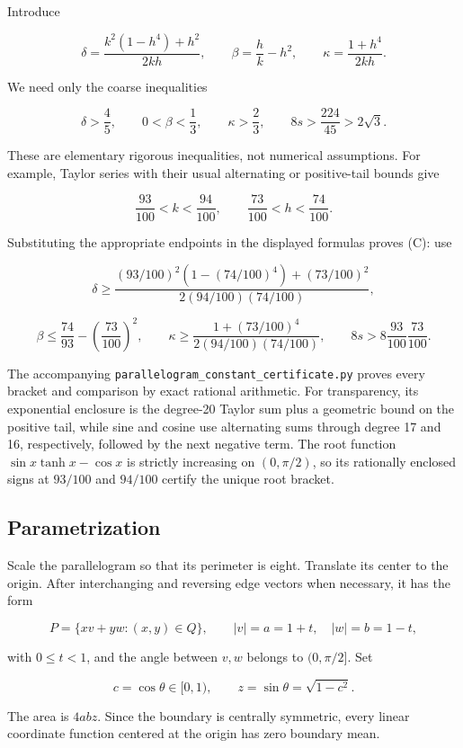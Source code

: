 \documentclass[11pt,a4paper]{article}
\begin{document}
Introduce

\[
\delta=\frac{k^2(1-h^4)+h^2}{2kh},\qquad
\beta=\frac hk-h^2,\qquad
\kappa=\frac{1+h^4}{2kh}.
\]

We need only the coarse inequalities

\[
\delta>\frac45,\qquad 0<\beta<\frac13,\qquad
\kappa>\frac23,\qquad
8s>\frac{224}{45}>2\sqrt3.
\tag{C}
\]

These are elementary rigorous inequalities, not numerical assumptions.
For example, Taylor series with their usual alternating or positive-tail
bounds give

\[
\frac{93}{100}<k<\frac{94}{100},\qquad
\frac{73}{100}<h<\frac{74}{100}.
\]

Substituting the appropriate endpoints in the displayed formulas proves
(C): use

\[
\delta\ge
\frac{(93/100)^2(1-(74/100)^4)+(73/100)^2}
{2(94/100)(74/100)},
\]

\[
\beta\le\frac{74}{93}-\left(\frac{73}{100}\right)^2,
\qquad
\kappa\ge\frac{1+(73/100)^4}{2(94/100)(74/100)},
\qquad
8s>8\frac{93}{100}\frac{73}{100}.
\]

The accompanying \texttt{parallelogram\_constant\_certificate.py} proves
every bracket and comparison by exact rational arithmetic. For
transparency, its exponential enclosure is the degree-20 Taylor sum plus
a geometric bound on the positive tail, while sine and cosine use
alternating sums through degree 17 and 16, respectively, followed by the
next negative term. The root function \(\sin x \tanh x-\cos x\) is
strictly increasing on \((0,\pi /2)\), so its rationally enclosed signs at
\(93/100\) and \(94/100\) certify the unique root bracket.

\hypertarget{022-parametrization}{%
\subsection{Parametrization}\label{022-parametrization}}

Scale the parallelogram so that its perimeter is eight. Translate its
center to the origin. After interchanging and reversing edge vectors
when necessary, it has the form

\[
P=\{xv+yw:(x,y)\in Q\},\qquad
|v|=a=1+t,\quad |w|=b=1-t,
\]

with \(0\le t<1\), and the angle between \(v,w\) belongs to \((0,\pi /2]\).
Set

\[
c=\cos\theta\in[0,1),\qquad z=\sin\theta=\sqrt{1-c^2}.
\]

The area is \(4abz\). Since the boundary is centrally symmetric, every
linear coordinate function centered at the origin has zero boundary
mean.
\end{document}
